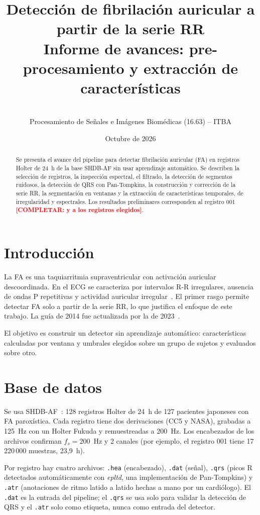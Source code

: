 \documentclass[11pt,a4paper]{article}
\title{Detección de fibrilación auricular a partir de la serie RR\\[4pt]
\large Informe de avances: pre-procesamiento y extracción de características}
\author{\completar{integrantes} \\ Procesamiento de Señales e Imágenes Biomédicas (16.63) -- ITBA}
\date{Octubre de 2026}
\newcommand{\completar}[1]{\textcolor{red}{\textbf{[COMPLETAR: #1]}}}
\begin{document}
\maketitle

\begin{abstract}
Se presenta el avance del pipeline para detectar fibrilación auricular (FA) en registros Holter de 24~h de la base SHDB-AF sin usar aprendizaje automático. Se describen la selección de registros, la inspección espectral, el filtrado, la detección de segmentos ruidosos, la detección de QRS con Pan-Tompkins, la construcción y corrección de la serie RR, la segmentación en ventanas y la extracción de características temporales, de irregularidad y espectrales. Los resultados preliminares corresponden al registro 001 \completar{y a los registros elegidos}.
\end{abstract}

\section{Introducción}
La FA es una taquiarritmia supraventricular con activación auricular descoordinada. En el ECG se caracteriza por intervalos R-R irregulares, ausencia de ondas P repetitivas y actividad auricular irregular~\cite{january2014}. El primer rasgo permite detectar FA solo a partir de la serie RR, lo que justifica el enfoque de este trabajo. La guía de 2014 fue actualizada por la de 2023~\cite{joglar2023}.

El objetivo es construir un detector sin aprendizaje automático: características calculadas por ventana y umbrales elegidos sobre un grupo de sujetos y evaluados sobre otro.

\section{Base de datos}
Se usa SHDB-AF~\cite{tsutsui2025,shdbreadme}: 128 registros Holter de 24~h de 127 pacientes japoneses con FA paroxística. Cada registro tiene dos derivaciones (CC5 y NASA), grabadas a 125~Hz con un Holter Fukuda y remuestreadas a 200~Hz. Los encabezados de los archivos confirman $f_s = 200$~Hz y 2 canales (por ejemplo, el registro 001 tiene 17\,220\,000 muestras, 23,9~h).

Por registro hay cuatro archivos: \texttt{.hea} (encabezado), \texttt{.dat} (señal), \texttt{.qrs} (picos R detectados automáticamente con \textit{epltd}, una implementación de Pan-Tompkins) y \texttt{.atr} (anotaciones de ritmo latido a latido hechas a mano por un cardiólogo). El \texttt{.dat} es la entrada del pipeline; el \texttt{.qrs} se usa solo para validar la detección de QRS y el \texttt{.atr} solo como etiqueta, nunca como entrada del detector.
\end{document}
